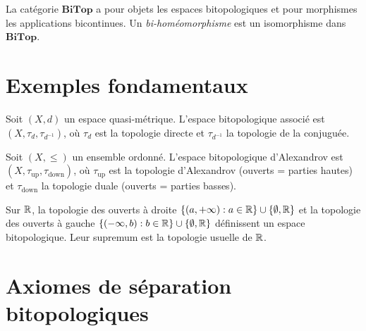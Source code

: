 \begin{definition}
La cat\'egorie $\mathbf{BiTop}$ a pour objets les espaces bitopologiques et pour
morphismes les applications bicontinues. Un \emph{bi-hom\'eomorphisme} est un isomorphisme
dans $\mathbf{BiTop}$.
\end{definition}

\section{Exemples fondamentaux}

\begin{exemple}
Soit $(X,d)$ un espace quasi-m\'etrique. L'espace bitopologique associ\'e est
$(X, \tau_d, \tau_{d^{-1}})$, o\`u $\tau_d$ est la topologie directe et $\tau_{d^{-1}}$ la
topologie de la conjugu\'ee.
\end{exemple}

\begin{exemple}
Soit $(X,\leq)$ un ensemble ordonn\'e. L'espace bitopologique d'Alexandrov est
$(X, \tau_{\mathrm{up}}, \tau_{\mathrm{down}})$, o\`u $\tau_{\mathrm{up}}$ est la topologie
d'Alexandrov (ouverts = parties hautes) et $\tau_{\mathrm{down}}$ la topologie duale
(ouverts = parties basses).
\end{exemple}

\begin{exemple}
Sur $\mathbb{R}$, la topologie des ouverts \`a droite $\{(a,+\infty) : a \in \mathbb{R}\} \cup
\{\emptyset, \mathbb{R}\}$ et la topologie des ouverts \`a gauche
$\{(-\infty, b) : b \in \mathbb{R}\} \cup \{\emptyset, \mathbb{R}\}$ d\'efinissent un espace
bitopologique. Leur supremum est la topologie usuelle de $\mathbb{R}$.
\end{exemple}

\section{Axiomes de s\'eparation bitopologiques}

